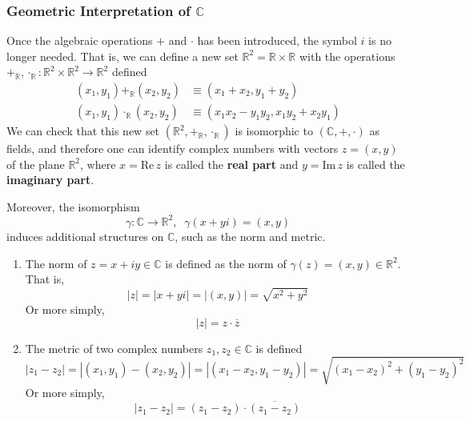 \documentclass{article}
\begin{document}
    \subsubsection[Geometric Interpretation of C]{Geometric Interpretation of $\mathbb{C}$}
    Once the algebraic operations $+$ and $\cdot$ has been introduced, the symbol $i$ is no longer needed. That is, we can define a new set $\mathbb{R}^2 = \mathbb{R} \times \mathbb{R}$ with the operations $+_\mathbb{R}, \cdot_\mathbb{R} : \mathbb{R}^2 \times \mathbb{R}^2 \longrightarrow \mathbb{R}^2$ defined
    \begin{align*}
        (x_1, y_1) +_\mathbb{R} (x_2, y_2) & \equiv (x_1 + x_2, y_1 + y_2) \\
        (x_1, y_1) \cdot_\mathbb{R} (x_2, y_2) & \equiv (x_1 x_2 - y_1 y_2, x_1 y_2 + x_2 y_1)
    \end{align*}
    We can check that this new set $(\mathbb{R}^2, +_\mathbb{R}, \cdot_{\mathbb{R}})$ is isomorphic to $(\mathbb{C}, +, \cdot)$ as fields, and therefore one can identify complex numbers with vectors $z = (x, y)$ of the plane $\mathbb{R}^2$, where $x = \text{Re}\,z$ is called the \textbf{real part} and $y = \text{Im}\,z$ is called the \textbf{imaginary part}. 

    \begin{definition}
      Moreover, the isomorphism
      \[\gamma: \mathbb{C} \longrightarrow \mathbb{R}^2, \;\; \gamma(x + yi) = (x, y)\]
      induces additional structures on $\mathbb{C}$, such as the norm and metric. 
      \begin{enumerate}
        \item The norm of $z = x + iy \in \mathbb{C}$ is defined as the norm of $\gamma(z) = (x, y) \in \mathbb{R}^2$. That is, 
        \[|z| = |x + yi| = |(x, y)| = \sqrt{x^2 + y^2}\]
        Or more simply, 
        \[|z| = z \cdot \overline{z}\]
        \item The metric of two complex numbers $z_1, z_2 \in \mathbb{C}$ is defined
        \[|z_1 - z_2| = |(x_1, y_1) - (x_2, y_2)| = |(x_1 - x_2, y_1 - y_2)| = \sqrt{(x_1 - x_2)^2 + (y_1 - y_2)^2}\]
        Or more simply, 
        \[|z_1 - z_2| = (z_1 - z_2) \cdot \overline{(z_1 - z_2)}\]
      \end{enumerate}
    \end{definition}
\end{document}
